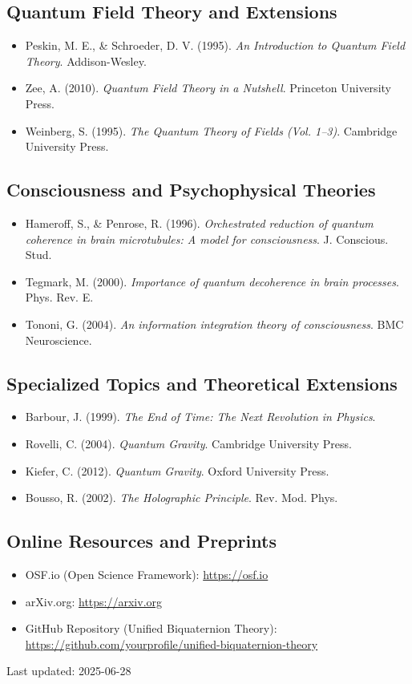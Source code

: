 \subsection*{Quantum Field Theory and Extensions}
\begin{itemize}
  \item Peskin, M. E., & Schroeder, D. V. (1995). \textit{An Introduction to Quantum Field Theory}. Addison-Wesley.
  \item Zee, A. (2010). \textit{Quantum Field Theory in a Nutshell}. Princeton University Press.
  \item Weinberg, S. (1995). \textit{The Quantum Theory of Fields (Vol. 1–3)}. Cambridge University Press.
\end{itemize}

\subsection*{Consciousness and Psychophysical Theories}
\begin{itemize}
  \item Hameroff, S., & Penrose, R. (1996). \textit{Orchestrated reduction of quantum coherence in brain microtubules: A model for consciousness}. J. Conscious. Stud.
  \item Tegmark, M. (2000). \textit{Importance of quantum decoherence in brain processes}. Phys. Rev. E.
  \item Tononi, G. (2004). \textit{An information integration theory of consciousness}. BMC Neuroscience.
\end{itemize}

\subsection*{Specialized Topics and Theoretical Extensions}
\begin{itemize}
  \item Barbour, J. (1999). \textit{The End of Time: The Next Revolution in Physics}.
  \item Rovelli, C. (2004). \textit{Quantum Gravity}. Cambridge University Press.
  \item Kiefer, C. (2012). \textit{Quantum Gravity}. Oxford University Press.
  \item Bousso, R. (2002). \textit{The Holographic Principle}. Rev. Mod. Phys.
\end{itemize}

\subsection*{Online Resources and Preprints}
\begin{itemize}
  \item OSF.io (Open Science Framework): \url{https://osf.io}
  \item arXiv.org: \url{https://arxiv.org}
  \item GitHub Repository (Unified Biquaternion Theory): \url{https://github.com/yourprofile/unified-biquaternion-theory}
\end{itemize}

\vspace{1cm}
\noindent Last updated: 2025-06-28
